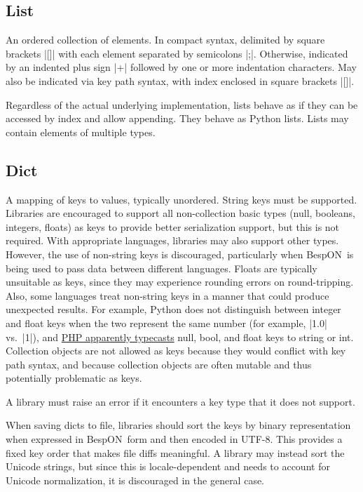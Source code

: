 \documentclass[11pt]{article}
\newcommand{\bespon}{BespON}
\begin{document}
\subsection{List}

An ordered collection of elements.  In compact syntax, delimited by square brackets |[]| with each element separated by semicolons |;|.  Otherwise, indicated by an indented plus sign |+| followed by one or more indentation characters.  May also be indicated via key path syntax, with index enclosed in square brackets |[]|.

Regardless of the actual underlying implementation, lists behave as if they can be accessed by index and allow appending.  They behave as Python lists.  Lists may contain elements of multiple types.


\subsection{Dict}

A mapping of keys to values, typically unordered.  String keys must be supported.  Libraries are encouraged to support all non-collection basic types (null, booleans, integers, floats) as keys to provide better serialization support, but this is not required.  With appropriate languages, libraries may also support other types.  However, the use of non-string keys is discouraged, particularly when \bespon\ is being used to pass data between different languages.  Floats are typically unsuitable as keys, since they may experience rounding errors on round-tripping.  Also, some languages treat non-string keys in a manner that could produce unexpected results.  For example, Python does not distinguish between integer and float keys when the two represent the same number (for example, |1.0| vs.\ |1|), and \href{http://php.net/manual/en/language.types.array.php}{PHP apparently typecasts} null, bool, and float keys to string or int.  Collection objects are not allowed as keys because they would conflict with key path syntax, and because collection objects are often mutable and thus potentially problematic as keys.

A library must raise an error if it encounters a key type that it does not support.

When saving dicts to file, libraries should sort the keys by binary representation when expressed in \bespon\ form and then encoded in UTF-8.  This provides a fixed key order that makes file diffs meaningful.  A library may instead sort the Unicode strings, but since this is locale-dependent and needs to account for Unicode normalization, it is discouraged in the general case.
\end{document}
